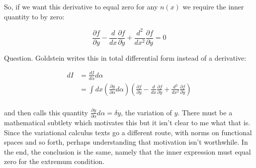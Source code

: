 \documentclass{article}      %
\newcommand{\ydot}[0]{\dot{y}}
\newcommand{\yddot}[0]{\ddot{y}}
\newcommand{\PD}[2]{\frac{\partial {#2}}{\partial {#1}}}
\begin{document}
So, if we want this derivative to equal zero for any $n(x)$ we require the inner quantity to by zero:

\begin{equation}
\PD{y}{f} - \frac{d}{ d x} \PD{\ydot}{f} + \frac{d^2}{dx^2} \PD{\yddot}{f} = 0
\end{equation}

Question.  Goldstein writes this in total differential form instead of a derivative:

\begin{align*}
dI &= \frac{dI}{d\alpha} d\alpha \\
&= \int d x \left(\PD{\alpha}{y} d \alpha\right) \left( \PD{y}{f} - \frac{d}{ d x} \PD{\ydot}{f} + \frac{d^2}{dx^2} \PD{\yddot}{f} \right) \\
\end{align*}

and then calls this quantity $\PD{\alpha}{y} d \alpha = \delta y$, the variation of $y$.  There must be a mathematical subtlety which motivates this
but it isn't clear to me what that is.  Since the variational calculus texts go a different route, with norms on functional spaces and so forth, perhaps
understanding that motivation isn't worthwhile.  In the end, the conclusion is the same, namely that the inner expression must equal zero for the extremum
condition.
\end{document}

